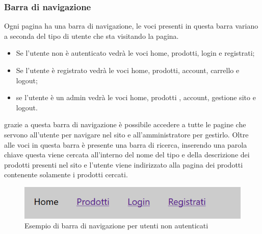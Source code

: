 \subsubsection{Barra di navigazione} 
Ogni pagina ha una barra di navigazione, le voci presenti in questa barra variano a seconda del tipo di utente che sta visitando la pagina.
\begin{itemize}
\item Se l'utente non è autenticato vedrà le voci home, prodotti, login e registrati;
\item Se l'utente è registrato vedrà le voci home, prodotti, account, carrello e logout;
\item se l'utente è un admin vedrà le voci home, prodotti , account, gestione sito e logout.
\end{itemize}
grazie a questa barra di navigazione è possibile accedere a tutte le pagine che servono all'utente per navigare nel sito e all'amministratore per gestirlo. Oltre alle voci in questa barra è presente una barra di ricerca, inserendo una parola chiave questa viene cercata all'interno del nome del tipo e della descrizione dei prodotti presenti nel sito e l'utente viene indirizzato alla pagina dei prodotti contenente solamente i prodotti cercati.
\begin{figure}[h]
	\label{navbarz} 
	\centering 
	\includegraphics[width=1\textwidth]{immagini/navbar.png}
	\caption{Esempio di barra di navigazione per utenti non autenticati} 
\end{figure}

